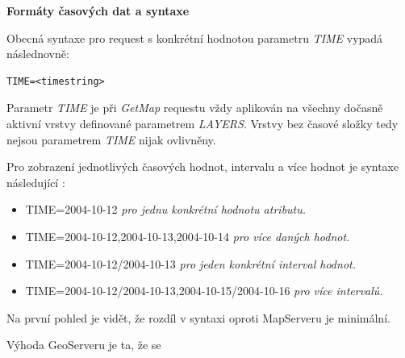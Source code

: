 \bigskip
\noindent
\textbf{Formáty časových dat a syntaxe}

Obecná syntaxe pro request s konkrétní hodnotou parametru \textit{TIME} vypadá následnovně: 

\begin{verbatim}
TIME=<timestring>
\end{verbatim}

Parametr \textit{TIME} je při \textit{GetMap} requestu vždy aplikován na všechny dočasně aktivní vrstvy definované parametrem \textit{LAYERS}. Vrstvy bez časové složky tedy nejsou parametrem \textit{TIME} nijak ovlivněny.

Pro zobrazení jednotlivých časových hodnot, intervalu a více hodnot je syntaxe následující \cite{geoserver-time}: 

\begin{itemize}
	\item TIME=2004-10-12 \textit{pro jednu konkrétní hodnotu atributu.}
	\item TIME=2004-10-12,2004-10-13,2004-10-14 \textit{pro více daných hodnot.}
	\item TIME=2004-10-12/2004-10-13 \textit{pro jeden konkrétní interval hodnot.}
	\item TIME=2004-10-12/2004-10-13,2004-10-15/2004-10-16 \textit{pro více intervalů.}
\end{itemize}

Na první pohled je vidět, že rozdíl v syntaxi oproti MapServeru je minimální.

Výhoda GeoServeru je ta, že se 




 
